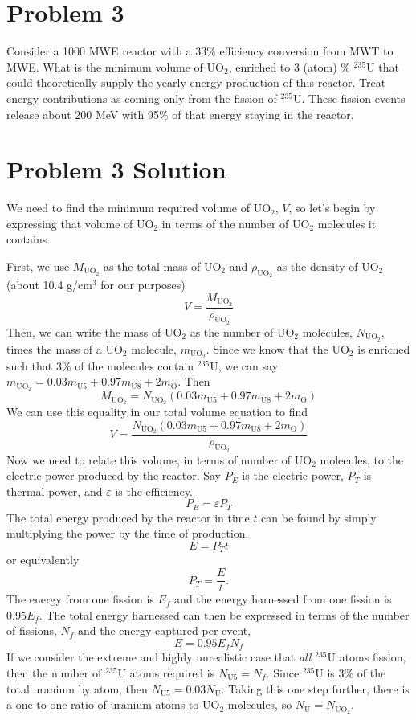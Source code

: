 \documentclass{report}
\begin{document}
\newpage
\section*{Problem 3}

Consider a 1000 MWE reactor with a 33\% efficiency conversion from MWT to MWE. What is the minimum volume of UO$_2$, enriched to 3 (atom) \% $^{235}$U that could theoretically supply the yearly energy production of this reactor. Treat energy contributions as coming only from the fission of $^{235}$U. These fission events release about 200 MeV with 95\% of that energy staying in the reactor.



\section*{Problem 3 Solution}

We need to find the minimum required volume of UO$_2$, $V$, so let's begin by expressing that volume of UO$_2$ in terms of the number of UO$_2$ molecules it contains. 

First, we use $M_{\text{UO}_2}$ as the total mass of UO$_2$ and $\rho_{\text{UO}_2}$ as the density of UO$_2$ (about 10.4 g/cm$^3$ for our purposes)
$$ V = \frac{M_{\text{UO}_2}}{\rho_{\text{UO}_2}} $$
Then, we can write the mass of UO$_2$ as the number of UO$_2$ molecules, $N_{\text{UO}_2}$, times the mass of a UO$_2$ molecule, $m_{\text{UO}_2}$. Since we know that the UO$_2$ is enriched such that 3\% of the molecules contain $^{235}$U, we can say $m_{\text{UO}_2} = 0.03m_{\text{U5}} + 0.97m_{\text{U8}} + 2m_{\text{O}}$. Then
$$ M_{\text{UO}_2} = N_{\text{UO}_2}(0.03m_{\text{U5}} + 0.97m_{\text{U8}} + 2m_{\text{O}}) $$
We can use this equality in our total volume equation to find
\begin{equation}
\label{vol}
V = \frac{N_{\text{UO}_2}(0.03m_{\text{U5}} + 0.97m_{\text{U8}} + 2 m_{\text{O}})}{\rho_{\text{UO}_2}}
\end{equation}
Now we need to relate this volume, in terms of number of UO$_2$ molecules, to the electric power produced by the reactor. Say $P_E$ is the electric power, $P_T$ is thermal power, and $\varepsilon$ is the efficiency. 
$$ P_E = \varepsilon P_T $$
The total energy produced by the reactor in time $t$ can be found by simply multiplying the power by the time of production.
$$ E = P_T t $$
or equivalently
$$ P_T = \frac{E}{t} .$$
The energy from one fission is $E_f$ and the energy harnessed from one fission is $0.95E_f$. The total energy harnessed can then be expressed in terms of the number of fissions, $N_f$ and the energy captured per event,
$$ E = 0.95E_f N_f $$
If we consider the extreme and highly unrealistic case that \textit{all} $^{235}$U atoms fission, then the number of $^{235}$U atoms required is $N_{\text{U5}} = N_f$. Since $^{235}$U is 3\% of the total uranium by atom, then $N_{\text{U5}} = 0.03N_{\text{U}}$. Taking this one step further, there is a one-to-one ratio of uranium atoms to UO$_2$ molecules, so $N_{\text{U}} = N_{\text{UO}_2}$.
\end{document}
